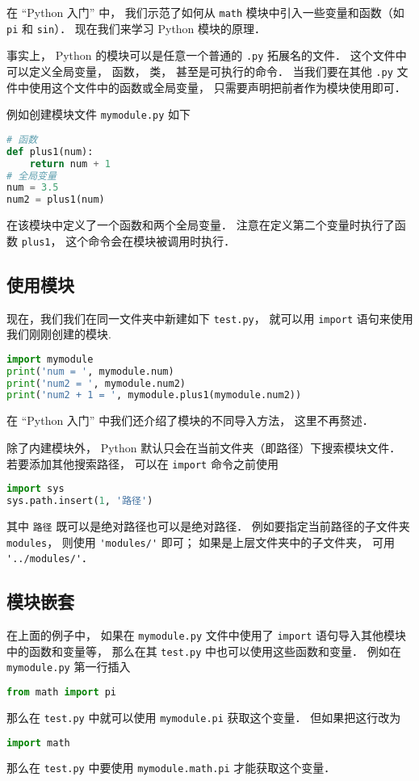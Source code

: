 

在 “Python 入门” 中， 我们示范了如何从 \verb|math| 模块中引入一些变量和函数（如 \verb|pi| 和 \verb|sin|）． 现在我们来学习 Python 模块的原理．

事实上， Python 的模块可以是任意一个普通的 \verb|.py| 拓展名的文件． 这个文件中可以定义全局变量， 函数， 类， 甚至是可执行的命令． 当我们要在其他 \verb|.py| 文件中使用这个文件中的函数或全局变量， 只需要声明把前者作为模块使用即可．

例如创建模块文件 \verb|mymodule.py| 如下
\begin{lstlisting}[language=python]
# 函数
def plus1(num):
    return num + 1
# 全局变量
num = 3.5
num2 = plus1(num)
\end{lstlisting}
在该模块中定义了一个函数和两个全局变量． 注意在定义第二个变量时执行了函数 \verb|plus1|， 这个命令会在模块被调用时执行．

\subsection{使用模块}
现在，我们我们在同一文件夹中新建如下 \verb|test.py|， 就可以用 \verb|import| 语句来使用我们刚刚创建的模块.
\begin{lstlisting}[language=python]
import mymodule
print('num = ', mymodule.num)
print('num2 = ', mymodule.num2)
print('num2 + 1 = ', mymodule.plus1(mymodule.num2))
\end{lstlisting}
在 “Python 入门” 中我们还介绍了模块的不同导入方法， 这里不再赘述．

除了内建模块外， Python 默认只会在当前文件夹（即路径）下搜索模块文件． 若要添加其他搜索路径， 可以在 \verb|import| 命令之前使用
\begin{lstlisting}[language=python]
import sys
sys.path.insert(1, '路径')
\end{lstlisting}
其中 \verb|路径| 既可以是绝对路径也可以是绝对路径． %
例如要指定当前路径的子文件夹 \verb|modules|， 则使用 \verb|'modules/'| 即可； 如果是上层文件夹中的子文件夹， 可用 \verb|'../modules/'|．

\subsection{模块嵌套}
在上面的例子中， 如果在 \verb|mymodule.py| 文件中使用了 \verb|import| 语句导入其他模块中的函数和变量等， 那么在其 \verb|test.py| 中也可以使用这些函数和变量． 例如在 \verb|mymodule.py| 第一行插入
\begin{lstlisting}[language=python]
from math import pi
\end{lstlisting}
那么在 \verb|test.py| 中就可以使用 \verb|mymodule.pi| 获取这个变量． 但如果把这行改为
\begin{lstlisting}[language=python]
import math
\end{lstlisting}
那么在 \verb|test.py| 中要使用 \verb|mymodule.math.pi| 才能获取这个变量．

